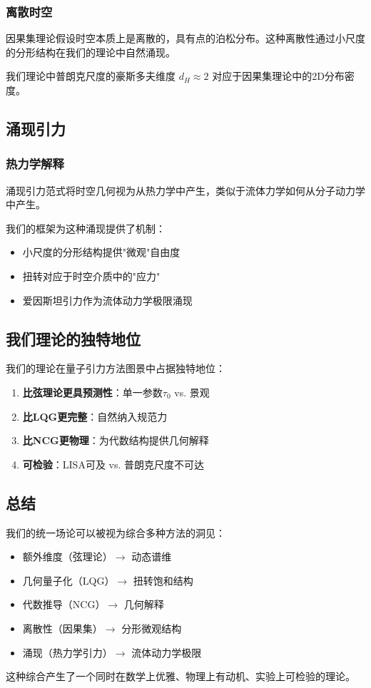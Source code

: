 \subsubsection{离散时空}

因果集理论假设时空本质上是离散的，具有点的泊松分布。这种离散性通过小尺度的分形结构在我们的理论中自然涌现。

我们理论中普朗克尺度的豪斯多夫维度 $d_H \approx 2$ 对应于因果集理论中的2D分布密度。

\subsection{涌现引力}

\subsubsection{热力学解释}

涌现引力范式将时空几何视为从热力学中产生，类似于流体力学如何从分子动力学中产生。

我们的框架为这种涌现提供了机制：
\begin{itemize}
    \item 小尺度的分形结构提供"微观"自由度
    \item 扭转对应于时空介质中的"应力"
    \item 爱因斯坦引力作为流体动力学极限涌现
\end{itemize}

\subsection{我们理论的独特地位}

我们的理论在量子引力方法图景中占据独特地位：

\begin{enumerate}
    \item \textbf{比弦理论更具预测性}：单一参数$\tau_0$ vs. 景观
    \item \textbf{比LQG更完整}：自然纳入规范力
    \item \textbf{比NCG更物理}：为代数结构提供几何解释
    \item \textbf{可检验}：LISA可及 vs. 普朗克尺度不可达
\end{enumerate}

\subsection{总结}

我们的统一场论可以被视为综合多种方法的洞见：
\begin{itemize}
    \item 额外维度（弦理论）$\to$ 动态谱维
    \item 几何量子化（LQG）$\to$ 扭转饱和结构
    \item 代数推导（NCG）$\to$ 几何解释
    \item 离散性（因果集）$\to$ 分形微观结构
    \item 涌现（热力学引力）$\to$ 流体动力学极限
\end{itemize}

这种综合产生了一个同时在数学上优雅、物理上有动机、实验上可检验的理论。
